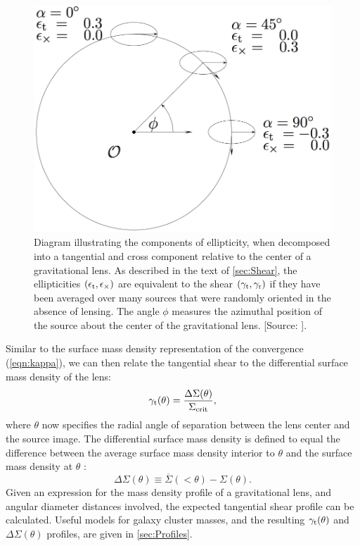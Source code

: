 \begin{figure}
\begin{center}
\includegraphics[scale=0.3]{plots_intro/ShearComponents.png}
\caption[Tangential Shear]{Diagram illustrating the components of ellipticity, when decomposed into a tangential and cross component relative to the center of a gravitational lens. As described in the text of \autoref{sec:Shear}, the ellipticities $(\epsilon_{\rm t},\epsilon_{\times})$ are equivalent to the shear $(\gamma_{\rm t},\gamma_{\rm r})$ if they have been averaged over many sources that were randomly oriented in the absence of lensing. The angle $\phi$ measures the azimuthal position of the source about the center of the gravitational lens. [Source: \citet{Schneider06_WeakGravLens}].}
\label{plot:shearcomponents}
\end{center}
\end{figure}

Similar to the surface mass density representation of the convergence (\autoref{eqn:kappa}), we can then relate the tangential shear to the differential surface mass density of the lens:
\begin{equation}
\gamma_{\rm t}(\theta) = \frac{\Delta\Sigma(\theta)}{\Sigma_{\rm crit}},
\end{equation}
where $\theta$ now specifies the radial angle of separation between the lens center and the source image. The differential surface mass density is defined to equal the difference between the average surface mass density interior to $\theta$ and the surface mass density at $\theta$ \citep{Wright00}: 
\begin{equation}
\label{eqn:deltasigma}
\Delta\Sigma(\theta) \equiv \overline{\Sigma}(< \theta) - \Sigma(\theta).
\end{equation}
Given an expression for the mass density profile of a gravitational lens, and angular diameter distances involved, the expected tangential shear profile can be calculated. Useful models for galaxy cluster masses, and the resulting $\gamma_{\rm t}(\theta)$ and $\Delta\Sigma(\theta)$ profiles, are given in \autoref{sec:Profiles}.


